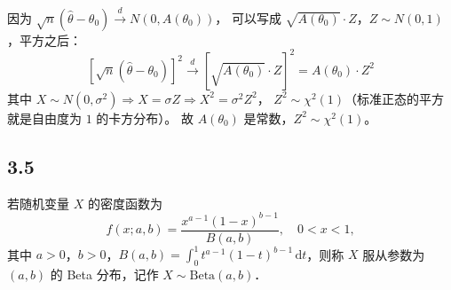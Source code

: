 \begin{note}
    因为 $\sqrt{n}(\hat{\theta} - \theta_0) \xrightarrow{d} N(0, A(\theta_0))$，
可以写成 $\sqrt{A(\theta_0)} \cdot Z$，$Z \sim N(0,1)$，平方之后：
$$\left[\sqrt{n}(\hat{\theta} - \theta_0)\right]^2 \xrightarrow{d} \left[\sqrt{A(\theta_0)} \cdot Z\right]^2 = A(\theta_0) \cdot Z^2$$
其中 $X \sim N(0,\sigma^2) \Rightarrow X = \sigma Z \Rightarrow X^2 = \sigma^2 Z^2$，
$Z^2 \sim \chi^2(1)$（标准正态的平方就是自由度为 $1$ 的卡方分布）。
故 $A(\theta_0)$ 是常数，$Z^2 \sim \chi^2(1)$。
\end{note}
\subsection{3.5}
\begin{definition}[Beta 分布]
若随机变量 $X$ 的密度函数为
\[
f(x; a, b) = \frac{x^{a-1}(1-x)^{b-1}}{B(a,b)}, \quad 0 < x < 1,
\]
其中 $a > 0$，$b > 0$，$B(a,b) = \int_0^1 t^{a-1}(1-t)^{b-1}\,\mathrm{d}t$，则称 $X$ 服从参数为 $(a,b)$ 的 Beta 分布，记作 $X \sim \text{Beta}(a,b)$．
\end{definition}

